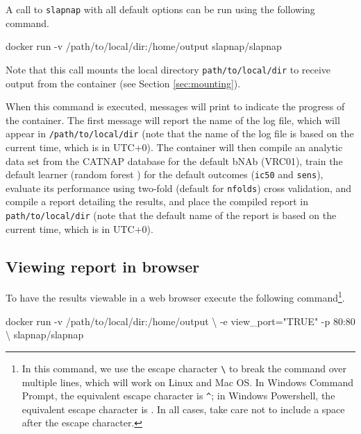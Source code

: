 \documentclass[]{article}
\newenvironment{Shaded}{\begin{snugshade}}{\end{snugshade}}
\newcommand{\StringTok}[1]{\textcolor[rgb]{0.31,0.60,0.02}{#1}}
\newcommand{\ExtensionTok}[1]{#1}
\newcommand{\NormalTok}[1]{#1}
\begin{document}
A call to \texttt{slapnap} with all default options can be run using the
following command.

\begin{Shaded}
\begin{Highlighting}[]
\ExtensionTok{docker}\NormalTok{ run -v /path/to/local/dir:/home/output slapnap/slapnap}
\end{Highlighting}
\end{Shaded}

Note that this call mounts the local directory
\texttt{path/to/local/dir} to receive output from the container (see
Section \ref{sec:mounting}).

When this command is executed, messages will print to indicate the
progress of the container. The first message will report the name of the
log file, which will appear in \texttt{/path/to/local/dir} (note that
the name of the log file is based on the current time, which is in
UTC+0). The container will then compile an analytic data set from the
CATNAP database for the default bNAb (VRC01), train the default learner
(random forest \citep{breiman2001}) for the default outcomes
(\texttt{ic50} and \texttt{sens}), evaluate its performance using
two-fold (default for \texttt{nfolds}) cross validation, and compile a
report detailing the results, and place the compiled report in
\texttt{path/to/local/dir} (note that the default name of the report is
based on the current time, which is in UTC+0).

\subsection{Viewing report in browser}\label{sec:webbrowse}

To have the results viewable in a web browser execute the following
command\footnote{In this command, we use the escape character
  \texttt{\textbackslash{}} to break the command over multiple lines,
  which will work on Linux and Mac OS. In Windows Command Prompt, the
  equivalent escape character is \texttt{\^{}}; in Windows Powershell,
  the equivalent escape character is \texttt{\textasciigrave{}}. In all
  cases, take care not to include a space after the escape character.}.

\begin{Shaded}
\begin{Highlighting}[]
\ExtensionTok{docker}\NormalTok{ run -v /path/to/local/dir:/home/output \textbackslash{}}
\NormalTok{           -e view_port=}\StringTok{"TRUE"}\NormalTok{ -p 80:80 \textbackslash{}}
\NormalTok{           slapnap/slapnap}
\end{Highlighting}
\end{Shaded}
\end{document}
